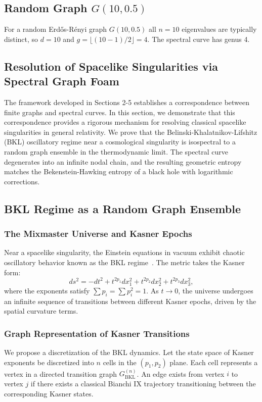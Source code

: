 \documentclass[12pt]{article}
\theoremstyle{definition}
\begin{document}
\subsection{Random Graph $G(10,0.5)$}
For a random Erd\H{o}s-R\'enyi graph $G(10,0.5)$ all $n = 10$ eigenvalues are typically distinct, so $d = 10$ and $g = \lfloor(10-1)/2\rfloor = 4$. The spectral curve has genus 4.

\subsection{Resolution of Spacelike Singularities via Spectral Graph Foam}
The framework developed in Sections 2-5 establishes a correspondence between finite graphs and spectral curves. In this section, we demonstrate that this correspondence provides a rigorous mechanism for resolving classical spacelike singularities in general relativity. We prove that the Belinski-Khalatnikov-Lifshitz (BKL) oscillatory regime near a cosmological singularity is isospectral to a random graph ensemble in the thermodynamic limit. The spectral curve degenerates into an infinite nodal chain, and the resulting geometric entropy matches the Bekenstein-Hawking entropy of a black hole with logarithmic corrections.

\subsection{BKL Regime as a Random Graph Ensemble}

\subsubsection{The Mixmaster Universe and Kasner Epochs}
Near a spacelike singularity, the Einstein equations in vacuum exhibit chaotic oscillatory behavior known as the BKL regime~\cite{Belinski1970, Belinski1982}. The metric takes the Kasner form:
\[
ds^2 = -dt^2 + t^{2p_1} dx_1^2 + t^{2p_2} dx_2^2 + t^{2p_3} dx_3^2,
\]
where the exponents satisfy $\sum p_i = \sum p_i^2 = 1$. As $t \to 0$, the universe undergoes an infinite sequence of transitions between different Kasner epochs, driven by the spatial curvature terms.

\subsubsection{Graph Representation of Kasner Transitions}
We propose a discretization of the BKL dynamics. Let the state space of Kasner exponents be discretized into $n$ cells in the $(p_1,p_2)$ plane. Each cell represents a vertex in a directed transition graph $G_{\text{BKL}}^{(n)}$. An edge exists from vertex $i$ to vertex $j$ if there exists a classical Bianchi IX trajectory transitioning between the corresponding Kasner states.
\end{document}
